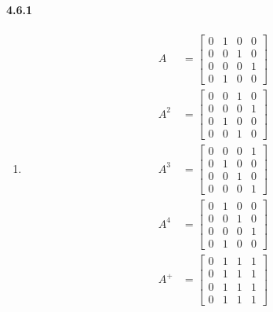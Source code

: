 \documentclass[11pt, letterpaper, twocolumn, fleqn]{article}
\begin{document}
    \paragraph{4.6.1}
        \begin{enumerate}
            \item 
                \begin{align*}
                    A &=   \begin{bmatrix}
                            0 & 1 & 0 & 0\\
                            0 & 0 & 1 & 0\\
                            0 & 0 & 0 & 1\\
                            0 & 1 & 0 & 0
                           \end{bmatrix} \\                  
                    A^2 &= \begin{bmatrix}
                            0 & 0 & 1 & 0\\
                            0 & 0 & 0 & 1\\
                            0 & 1 & 0 & 0\\
                            0 & 0 & 1 & 0 
                           \end{bmatrix} \\
                    A^3 &= \begin{bmatrix}
                            0 & 0 & 0 & 1\\
                            0 & 1 & 0 & 0\\
                            0 & 0 & 1 & 0\\
                            0 & 0 & 0 & 1
                           \end{bmatrix} \\
                    A^4 &= \begin{bmatrix}
                            0 & 1 & 0 & 0\\
                            0 & 0 & 1 & 0\\
                            0 & 0 & 0 & 1\\
                            0 & 1 & 0 & 0
                           \end{bmatrix} \\
                    A^+ &= \begin{bmatrix}
                            0 & 1 & 1 & 1\\
                            0 & 1 & 1 & 1\\
                            0 & 1 & 1 & 1\\
                            0 & 1 & 1 & 1
                           \end{bmatrix}
                \end{align*}
        \end{enumerate}
    
\end{document}
